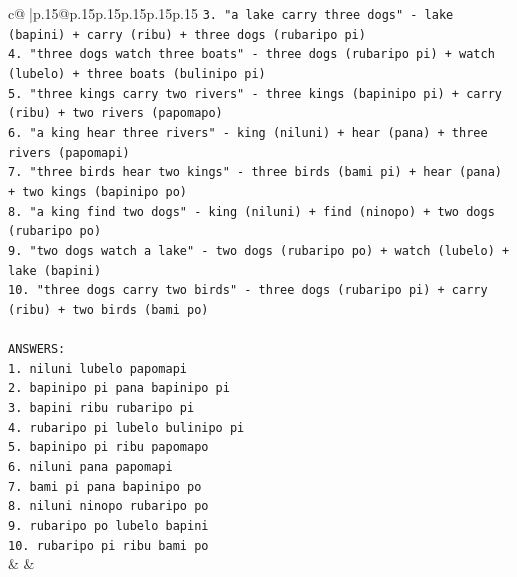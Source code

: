 \documentclass{article}
\begin{document}
{\begin{supertabular}{c@{$\;$}|p{.15\linewidth}@{}p{.15\linewidth}p{.15\linewidth}p{.15\linewidth}p{.15\linewidth}p{.15\linewidth}}
{{{\texttt{3. "a lake carry three dogs" {-} lake (bapini) + carry (ribu) + three dogs (rubaripo pi)} \\
\texttt{4. "three dogs watch three boats" {-} three dogs (rubaripo pi) + watch (lubelo) + three boats (bulinipo pi)} \\
\texttt{5. "three kings carry two rivers" {-} three kings (bapinipo pi) + carry (ribu) + two rivers (papomapo)} \\
\texttt{6. "a king hear three rivers" {-} king (niluni) + hear (pana) + three rivers (papomapi)} \\
\texttt{7. "three birds hear two kings" {-} three birds (bami pi) + hear (pana) + two kings (bapinipo po)} \\
\texttt{8. "a king find two dogs" {-} king (niluni) + find (ninopo) + two dogs (rubaripo po)} \\
\texttt{9. "two dogs watch a lake" {-} two dogs (rubaripo po) + watch (lubelo) + lake (bapini)} \\
\texttt{10. "three dogs carry two birds" {-} three dogs (rubaripo pi) + carry (ribu) + two birds (bami po)} \\
\\ 
\texttt{ANSWERS:} \\
\texttt{1. niluni lubelo papomapi} \\
\texttt{2. bapinipo pi pana bapinipo pi} \\
\texttt{3. bapini ribu rubaripo pi} \\
\texttt{4. rubaripo pi lubelo bulinipo pi} \\
\texttt{5. bapinipo pi ribu papomapo} \\
\texttt{6. niluni pana papomapi} \\
\texttt{7. bami pi pana bapinipo po} \\
\texttt{8. niluni ninopo rubaripo po} \\
\texttt{9. rubaripo po lubelo bapini} \\
\texttt{10. rubaripo pi ribu bami po} \\
            }
        }
    }
    & & \\ \\


\end{supertabular}}
\end{document}
